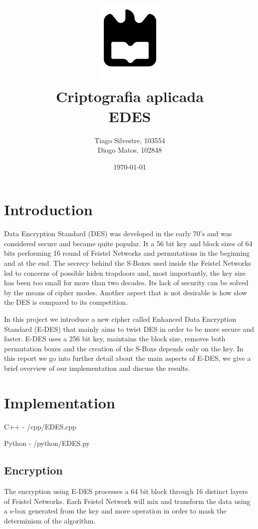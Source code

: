 \documentclass{article} %
\title{%
    \includegraphics[width=0.3\linewidth]{./assets/logo.pdf}\\[20pt]
    \Huge \bfseries Criptografia aplicada \\[10pt]
    \Large EDES
}
\author{Tiago Silvestre, 103554 \\ Diogo Matos, 102848}
\date{\today}
\begin{document}
\maketitle

\newpage

\tableofcontents

\clearpage

\section{Introduction}
Data Encryption Standard (DES) was developed in the early 70's and was considered secure and became quite popular. It a 56 bit key and block sizes of 64 bits performing 
16 round of Feistel Networks and permutations in the beginning and at the end. The secrecy behind the S-Boxes used inside the Feistel Networks led to concerns of possible
hiden trapdoors and, most importantly, the key size has been too small for more than two decades. Its lack of security can be solved by the means of cipher modes. Another
aspect that is not desirable is how slow the DES is compared to its competition.

In this project we introduce a new cipher called Enhanced Data Encryption Standard (E-DES) that mainly aims to twist DES in order to be more secure and faster. 
E-DES uses a 256 bit key, maintains the block size, removes both permutation boxes and the creation of the S-Boxs depends only on the key. In this report we go into 
further detail about the main aspects of E-DES, we give a brief overview of our implementation and discuss the results.

\section{Implementation}
\begin{tcolorbox}
  [width=\linewidth, colback=white!95!black, boxrule=0pt]
  C++    - /cpp/EDES.cpp

  Python - /python/EDES.py
\end{tcolorbox}


\subsection{Encryption}
The encryption using E-DES processes a 64 bit block through 16 distinct layers of Feistel Networks. 
Each Feistel Network will mix and transform the data using a s-box generated from the key and more
operation in order to mask the determinism of the algorithm. 
\end{document}
